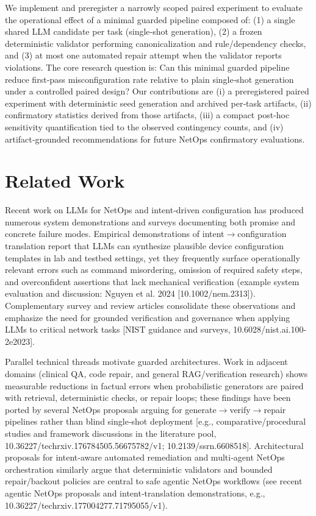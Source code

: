 \documentclass[conference]{IEEEtran}
\begin{document}
We implement and preregister a narrowly scoped paired experiment to evaluate the operational effect of a minimal guarded pipeline composed of: (1) a single shared LLM candidate per task (single‑shot generation), (2) a frozen deterministic validator performing canonicalization and rule/dependency checks, and (3) at most one automated repair attempt when the validator reports violations. The core research question is: Can this minimal guarded pipeline reduce first‑pass misconfiguration rate relative to plain single‑shot generation under a controlled paired design? Our contributions are (i) a preregistered paired experiment with deterministic seed generation and archived per‑task artifacts, (ii) confirmatory statistics derived from those artifacts, (iii) a compact post‑hoc sensitivity quantification tied to the observed contingency counts, and (iv) artifact‑grounded recommendations for future NetOps confirmatory evaluations.

\section{Related Work}
Recent work on LLMs for NetOps and intent‑driven configuration has produced numerous system demonstrations and surveys documenting both promise and concrete failure modes. Empirical demonstrations of intent\ensuremath{\rightarrow}configuration translation report that LLMs can synthesize plausible device configuration templates in lab and testbed settings, yet they frequently surface operationally relevant errors such as command misordering, omission of required safety steps, and overconfident assertions that lack mechanical verification (example system evaluation and discussion: Nguyen et al. 2024 [10.1002/nem.2313]). Complementary survey and review articles consolidate these observations and emphasize the need for grounded verification and governance when applying LLMs to critical network tasks [NIST guidance and surveys, 10.6028/nist.ai.100-2e2023].

Parallel technical threads motivate guarded architectures. Work in adjacent domains (clinical QA, code repair, and general RAG/verification research) shows measurable reductions in factual errors when probabilistic generators are paired with retrieval, deterministic checks, or repair loops; these findings have been ported by several NetOps proposals arguing for generate\ensuremath{\rightarrow}verify\ensuremath{\rightarrow}repair pipelines rather than blind single‑shot deployment [e.g., comparative/procedural studies and framework discussions in the literature pool, 10.36227/techrxiv.176784505.56675782/v1; 10.2139/ssrn.6608518]. Architectural proposals for intent‑aware automated remediation and multi‑agent NetOps orchestration similarly argue that deterministic validators and bounded repair/backout policies are central to safe agentic NetOps workflows (see recent agentic NetOps proposals and intent‑translation demonstrations, e.g., 10.36227/techrxiv.177004277.71795055/v1).
\end{document}

